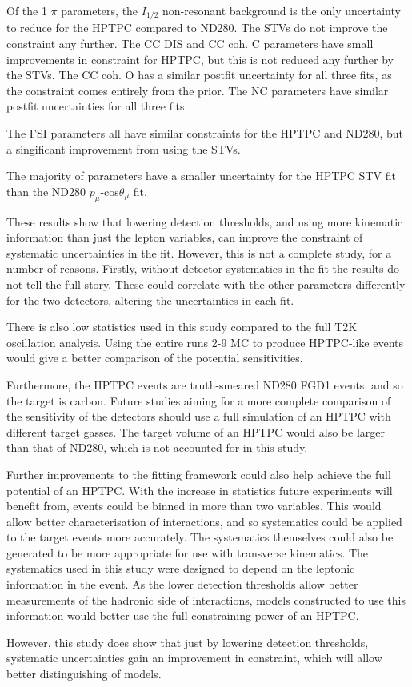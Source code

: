 Of the 1 $\pi$ parameters, the $I_{1/2}$ non-resonant background is the only uncertainty to reduce for the HPTPC compared to ND280. The STVs do not improve the constraint any further. The CC DIS and CC coh. C parameters have small improvements in constraint for HPTPC, but this is not reduced any further by the STVs. The CC coh. O has a similar postfit uncertainty for all three fits, as the constraint comes entirely from the prior. The NC parameters have similar postfit uncertainties for all three fits.

The FSI parameters all have similar constraints for the HPTPC and ND280, but a singificant improvement from using the STVs.

The majority of parameters have a smaller uncertainty for the HPTPC STV fit than the ND280 $p_{\mu}$-cos$\theta_{\mu}$ fit.

These results show that lowering detection thresholds, and using more kinematic information than just the lepton variables, can improve the constraint of systematic uncertainties in the fit. However, this is not a complete study, for a number of reasons. Firstly, without detector systematics in the fit the results do not tell the full story. These could correlate with the other parameters differently for the two detectors, altering the uncertainties in each fit.

There is also low statistics used in this study compared to the full T2K oscillation analysis. Using the entire runs 2-9 MC to produce HPTPC-like events would give a better comparison of the potential sensitivities.

Furthermore, the HPTPC events are truth-smeared ND280 FGD1 events, and so the target is carbon. Future studies aiming for a more complete comparison of the sensitivity of the detectors should use a full simulation of an HPTPC with different target gasses. The target volume of an HPTPC would also be larger than that of ND280, which is not accounted for in this study. 

Further improvements to the fitting framework could also help achieve the full potential of an HPTPC. With the increase in statistics future experiments will benefit from, events could be binned in more than two variables. This would allow better characterisation of interactions, and so systematics could be applied to the target events more accurately. The systematics themselves could also be generated to be more appropriate for use with transverse kinematics. The systematics used in this study were designed to depend on the leptonic information in the event. As the lower detection thresholds allow better measurements of the hadronic side of interactions, models constructed to use this information would better use the full constraining power of an HPTPC.

However, this study does show that just by lowering detection thresholds, systematic uncertainties gain an improvement in constraint, which will allow better distinguishing of models.

\newpage